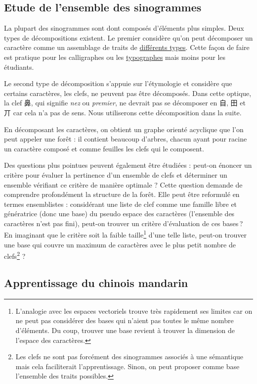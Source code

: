 \documentclass[12pt,oneside]{article}
\begin{document}
\subsection{Etude de l'ensemble des sinogrammes}

La plupart des sinogrammes sont dont composés d'éléments plus simples. Deux types de décompositions existent. Le premier considère qu'on peut décomposer un caractère comme un assemblage de traits de \href{https://en.wikipedia.org/wiki/Stroke\_\%28CJKV\_character\%29}{différents types}. Cette façon de faire est pratique pour les calligraphes ou les \href{http://www.wenlin.com/cdl/}{typographes} mais moins pour les étudiants.

Le second type de décomposition s'appuie sur l'étymologie et considère que certains caractères, les clefs, ne peuvent pas être décomposés. Dans cette optique, la clef 鼻, qui signifie \textsl{nez} ou \textsl{premier}, ne devrait pas se décomposer en 自, 田 et 丌 car cela n'a pas de sens. Nous utiliserons cette décomposition dans la suite.

En décomposant les caractères, on obtient un graphe orienté acyclique que l'on peut appeler une forêt : il contient beaucoup d'arbres, chacun ayant pour racine un caractère composé et comme feuilles les clefs qui le composent.

Des questions plus pointues peuvent également être étudiées : peut-on énoncer un critère pour évaluer la pertinence d'un ensemble de clefs et déterminer un ensemble vérifiant ce critère de manière optimale ? Cette question demande de comprendre profondément la structure de la forêt. Elle peut être reformulé en termes ensemblistes : considérant une liste de clef comme une famille libre et génératrice (donc une base) du pseudo espace des caractères (l'ensemble des caractères n'est pas fini), peut-on trouver un critère d'évaluation de ces bases ? En imaginant que le critère soit la faible taille\footnote{L'analogie avec les espaces vectoriels trouve très rapidement ses limites car on ne peut pas considérer des bases qui n'aient pas toutes le même nombre d'éléments. Du coup, trouver une base revient à trouver la dimension de l'espace des caractères.} d'une telle liste, peut-on trouver une base qui couvre un maximum de caractères avec le plus petit nombre de clefs\footnote{Les clefs ne sont pas forcément des sinogrammes associés à une sémantique mais cela faciliterait l'apprentissage. Sinon, on peut proposer comme base l'ensemble des traits possibles.} ?

\subsection{Apprentissage du chinois mandarin}
\end{document}
